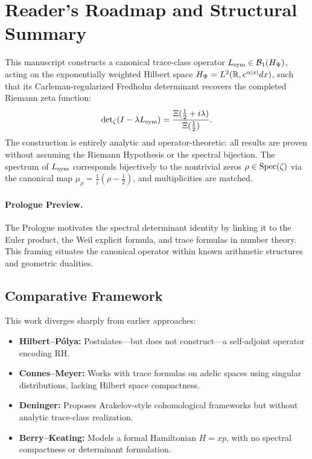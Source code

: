 \section*{Reader’s Roadmap and Structural Summary}

This manuscript constructs a canonical trace-class operator \( L_{\mathrm{sym}} \in \mathcal{B}_1(H_{\Psi}) \), acting on the exponentially weighted Hilbert space \( H_{\Psi} = L^2(\mathbb{R}, e^{\alpha|x|} dx) \), such that its Carleman-regularized Fredholm determinant recovers the completed Riemann zeta function:
\[
\det\nolimits_\zeta(I - \lambda L_{\mathrm{sym}}) = \frac{\Xi(\tfrac{1}{2} + i\lambda)}{\Xi(\tfrac{1}{2})}.
\]
The construction is entirely analytic and operator-theoretic: all results are proven without assuming the Riemann Hypothesis or the spectral bijection. The spectrum of \( L_{\mathrm{sym}} \) corresponds bijectively to the nontrivial zeros \( \rho \in \operatorname{Spec}(\zeta) \) via the canonical map \( \mu_\rho = \frac{1}{i}(\rho - \tfrac{1}{2}) \), and multiplicities are matched.

\paragraph{Prologue Preview.}
The Prologue motivates the spectral determinant identity by linking it to the Euler product, the Weil explicit formula, and trace formulas in number theory. This framing situates the canonical operator within known arithmetic structures and geometric dualities.

\subsection*{Comparative Framework}

This work diverges sharply from earlier approaches:

\begin{itemize}
  \item \textbf{Hilbert--Pólya:} Postulates—but does not construct—a self-adjoint operator encoding RH.
  \item \textbf{Connes--Meyer:} Works with trace formulas on adelic spaces using singular distributions, lacking Hilbert space compactness.
  \item \textbf{Deninger:} Proposes Arakelov-style cohomological frameworks but without analytic trace-class realization.
  \item \textbf{Berry--Keating:} Models a formal Hamiltonian \( H = xp \), with no spectral compactness or determinant formulation.
\end{itemize}

